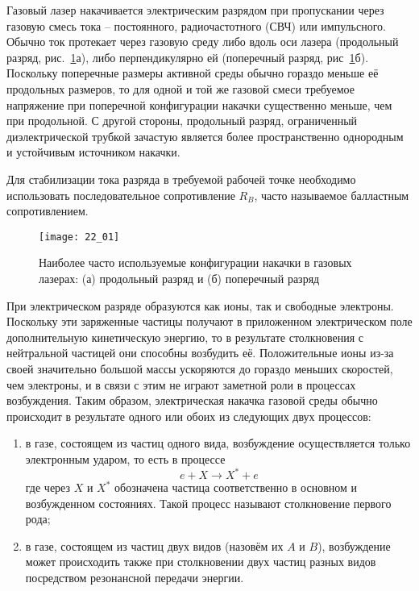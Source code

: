 
Газовый лазер накачивается электрическим разрядом при пропускании через 
газовую смесь тока -- постоянного, радиочастотного (СВЧ) или импульсного. 
Обычно ток протекает через газовую среду либо вдоль оси лазера 
(продольный разряд, рис.~\ref{img22.1}а), либо перпендикулярно ей (поперечный 
разряд, рис~\ref{img22.1}б). Поскольку поперечные размеры активной среды 
обычно гораздо меньше её продольных размеров, то для одной и той же газовой 
смеси требуемое напряжение при поперечной конфигурации накачки существенно 
меньше, чем при продольной. С другой стороны, продольный разряд, ограниченный 
диэлектрической трубкой зачастую является более пространственно однородным и 
устойчивым источником накачки. 

Для стабилизации тока разряда в требуемой рабочей точке необходимо 
использовать последовательное сопротивление \( R_B \), часто называемое 
балластным сопротивлением. 

\begin{figure}[h!]
    \center
    \texttt{[image: 22\_01]}
    \caption{Наиболее часто используемые конфигурации накачки в газовых 
    	лазерах: (а) продольный разряд и (б) поперечный разряд}
    \label{img22.1}
\end{figure}

При электрическом разряде образуются как ионы, так и свободные электроны. 
Поскольку эти заряженные частицы получают в приложенном электрическом поле 
дополнительную кинетическую энергию, то в результате столкновения с 
нейтральной частицей они способны возбудить её. Положительные ионы из-за 
своей значительно большой массы ускоряются до гораздо меньших скоростей, чем 
электроны, и в связи с этим не играют заметной роли в процессах возбуждения. 
Таким образом, электрическая накачка газовой среды обычно происходит в 
результате одного или обоих из следующих двух процессов:
\begin{enumerate}
	\item в газе, состоящем из частиц одного вида, возбуждение осуществляется 
		только электронным ударом, то есть в процессе 
		\[ e + X \rightarrow X^{*} + e \]
		где через \( X \) и \( X^{*} \) обозначена частица соответственно в 
		основном и возбужденном состояниях. Такой процесс называют 
		столкновение первого рода;
	\item в газе, состоящем из частиц двух видов (назовём их \( A \) и 
		\( B \)), возбуждение может происходить также при столкновении двух 
		частиц разных видов посредством резонансной передачи энергии.
\end{enumerate}

